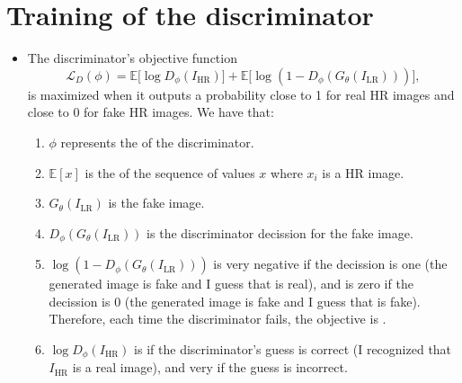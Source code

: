 \section*{Training of the discriminator}
\begin{itemize}
\item The discriminator’s objective function
\begin{equation}
  \mathcal{L}_D(\phi) = 
  \mathbb{E}\big[ \log D_\phi(I_{\text{HR}}) \big] 
  + \mathbb{E}\big[ \log (1 - D_\phi(G_\theta(I_{\text{LR}}))) \big],
\end{equation}
is maximized when it outputs a probability close to 1 for real HR
images and close to 0 for fake HR images. We have that:
\begin{enumerate}
\item $\phi$ represents the  of
  the discriminator.
\item $\mathbb{E}[x]$ is the
   of the sequence of values
  $x$ where $x_i$ is a HR image.
\item $G_\theta(I_{\text{LR}})$ is the fake image.
\item $ D_\phi(G_\theta(I_{\text{LR}}))$ is the discriminator decission for the fake image.
\item $\log(1 - D_\phi(G_\theta(I_{\text{LR}})))$ is very negative if
  the decission is one (the generated image is fake and I guess that
  is real), and is zero if the decission is 0 (the generated image is
  fake and I guess that is fake). Therefore, each time the
  discriminator fails, the objective is .
\item $\log D_\phi(I_{\text{HR}})$ is  if the
  discriminator's guess is correct (I recognized that $I_{\text{HR}}$
  is a real image), and very  if the guess is
  incorrect.
\end{enumerate}
\end{itemize}


